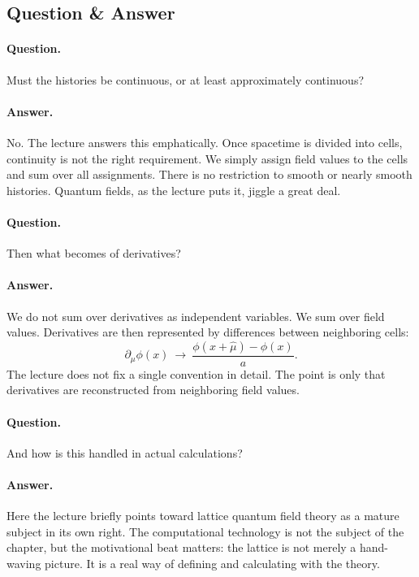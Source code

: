 \subsection{Question \& Answer}

\paragraph{Question.} Must the histories be continuous, or at least approximately continuous?

\paragraph{Answer.} No. The lecture answers this emphatically. Once spacetime is divided into cells, continuity is not the right requirement. We simply assign field values to the cells and sum over all assignments. There is no restriction to smooth or nearly smooth histories. Quantum fields, as the lecture puts it, jiggle a great deal.

\paragraph{Question.} Then what becomes of derivatives?

\paragraph{Answer.} We do not sum over derivatives as independent variables. We sum over field values. Derivatives are then represented by differences between neighboring cells:
\begin{equation}
\partial_\mu\phi(x)\ \longrightarrow\ \frac{\phi(x+\hat\mu)-\phi(x)}{a}.
\end{equation}
The lecture does not fix a single convention in detail. The point is only that derivatives are reconstructed from neighboring field values.

\paragraph{Question.} And how is this handled in actual calculations?

\paragraph{Answer.} Here the lecture briefly points toward lattice quantum field theory as a mature subject in its own right. The computational technology is not the subject of the chapter, but the motivational beat matters: the lattice is not merely a hand-waving picture. It is a real way of defining and calculating with the theory.

